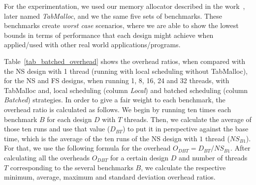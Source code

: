 \documentclass{llncs}
\begin{document}
For the experimentation, we used our memory allocator described in the
work~\cite{Areias-12b}, later named \emph{TabMalloc}, and we the same
five sets of benchmarks. These benchmarks create \emph{worst case}
scenarios, where we are able to show the lowest bounds in terms of
performance that each design might achieve when applied/used with
other real world applications/programs.

Table~\ref{tab_batched_overhead} shows the overhead ratios, when
compared with the NS design with 1 thread (running with local
scheduling without TabMalloc), for the NS and FS designs, when running
1, 8, 16, 24 and 32 threads, with TabMalloc and, local scheduling
(column \emph{Local}) and batched scheduling (column \emph{Batched})
strategies. In order to give a fair weight to each benchmark, the
overhead ratio is calculated as follows. We begin by running ten times
each benchmark $B$ for each design $D$ with $T$ threads. Then, we
calculate the average of those ten runs and use that value ($D_{BT}$)
to put it in perspective against the base time, which is the average
of the ten runs of the NS design with $1$ thread ($NS_{B1}$). For
that, we use the following formula for the overhead $O_{DBT} = D_{BT}
/ NS_{B1}$.  After calculating all the overheads $O_{DBT}$ for a
certain design $D$ and number of threads $T$ corresponding to the
several benchmarks $B$, we calculate the respective minimum, average,
maximum and standard deviation overhead ratios.
\end{document}

